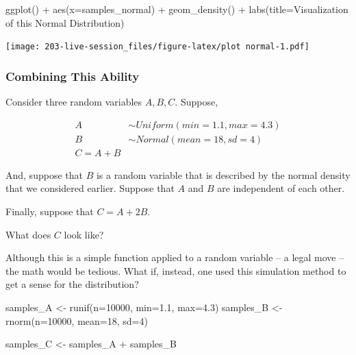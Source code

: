 \documentclass[
]{book}
\newenvironment{Shaded}{\begin{snugshade}}{\end{snugshade}}
\newcommand{\AttributeTok}[1]{\textcolor[rgb]{0.77,0.63,0.00}{#1}}
\newcommand{\DecValTok}[1]{\textcolor[rgb]{0.00,0.00,0.81}{#1}}
\newcommand{\FloatTok}[1]{\textcolor[rgb]{0.00,0.00,0.81}{#1}}
\newcommand{\FunctionTok}[1]{\textcolor[rgb]{0.00,0.00,0.00}{#1}}
\newcommand{\NormalTok}[1]{#1}
\newcommand{\OtherTok}[1]{\textcolor[rgb]{0.56,0.35,0.01}{#1}}
\newcommand{\SpecialCharTok}[1]{\textcolor[rgb]{0.00,0.00,0.00}{#1}}
\newcommand{\StringTok}[1]{\textcolor[rgb]{0.31,0.60,0.02}{#1}}
\theoremstyle{definition}
\theoremstyle{definition}
\theoremstyle{definition}
\theoremstyle{definition}
\theoremstyle{remark}
\begin{document}
\begin{Shaded}
\begin{Highlighting}[]
\FunctionTok{ggplot}\NormalTok{() }\SpecialCharTok{+} 
  \FunctionTok{aes}\NormalTok{(}\AttributeTok{x=}\NormalTok{samples\_normal) }\SpecialCharTok{+} 
  \FunctionTok{geom\_density}\NormalTok{() }\SpecialCharTok{+} 
  \FunctionTok{labs}\NormalTok{(}\AttributeTok{title=}\StringTok{\textquotesingle{}Visualization of this Normal Distribution\textquotesingle{}}\NormalTok{)}
\end{Highlighting}
\end{Shaded}

\texttt{[image: 203-live-session\_files/figure-latex/plot normal-1.pdf]}

\hypertarget{combining-this-ability}{%
\subsubsection{Combining This Ability}\label{combining-this-ability}}

Consider three random variables \(A, B, C\). Suppose,

\[ 
  \begin{aligned}
    A & \sim Uniform(min=1.1, max=4.3) \\ 
    B & \sim Normal(mean=18, sd=4)     \\ 
    C = A + B
  \end{aligned}
\]

And, suppose that \(B\) is a random variable that is described by the normal density that we considered earlier. Suppose that \(A\) and \(B\) are independent of each other.

Finally, suppose that \(C = A + 2B\).

What does \(C\) look like?

Although this is a simple function applied to a random variable -- a legal move -- the math would be tedious. What if, instead, one used this simulation method to get a sense for the distribution?

\begin{Shaded}
\begin{Highlighting}[]
\NormalTok{samples\_A }\OtherTok{\textless{}{-}} \FunctionTok{runif}\NormalTok{(}\AttributeTok{n=}\DecValTok{10000}\NormalTok{, }\AttributeTok{min=}\FloatTok{1.1}\NormalTok{, }\AttributeTok{max=}\FloatTok{4.3}\NormalTok{)}
\NormalTok{samples\_B }\OtherTok{\textless{}{-}} \FunctionTok{rnorm}\NormalTok{(}\AttributeTok{n=}\DecValTok{10000}\NormalTok{, }\AttributeTok{mean=}\DecValTok{18}\NormalTok{, }\AttributeTok{sd=}\DecValTok{4}\NormalTok{)}

\NormalTok{samples\_C }\OtherTok{\textless{}{-}}\NormalTok{ samples\_A }\SpecialCharTok{+}\NormalTok{ samples\_B}
\end{Highlighting}
\end{Shaded}
\end{document}
